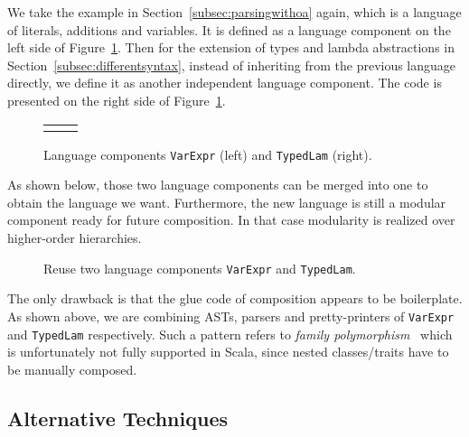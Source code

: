 We take the example in Section~\ref{subsec:parsingwithoa} again, which is a language of literals, additions and variables. It is defined as a
language component on the left side of Figure~\ref{fig:lng-components}.
Then for the extension of types and lambda abstractions in Section~\ref{subsec:differentsyntax}, instead of inheriting from the previous language directly, we define it as another independent language component. The code is presented on the right side of Figure~\ref{fig:lng-components}.

\begin{figure}[t]
\begin{tabular}{m{0.42\linewidth}m{0.52\linewidth}}
&
\end{tabular}
\caption{Language components \lstinline{VarExpr} (left) and \lstinline{TypedLam} (right).}\label{fig:lng-components}
\end{figure}

As shown below, those two language components can be merged into one to obtain the language we want. Furthermore, the new language is still a modular
component ready for future composition. In that case modularity is realized over higher-order hierarchies.

\begin{figure}[t]
\caption{Reuse two language components \lstinline{VarExpr} and \lstinline{TypedLam}.}\label{fig:compose-components}
\end{figure}

The only drawback is that the glue code of composition appears to be
boilerplate. As shown above, we are combining ASTs, parsers and
pretty-printers of \lstinline{VarExpr} and \lstinline{TypedLam}
respectively. Such a pattern refers to \textit{family
  polymorphism}~\cite{ernst01FP} which is unfortunately not fully supported
in Scala, since nested classes/traits have to be manually composed.

\subsection{Alternative Techniques}

